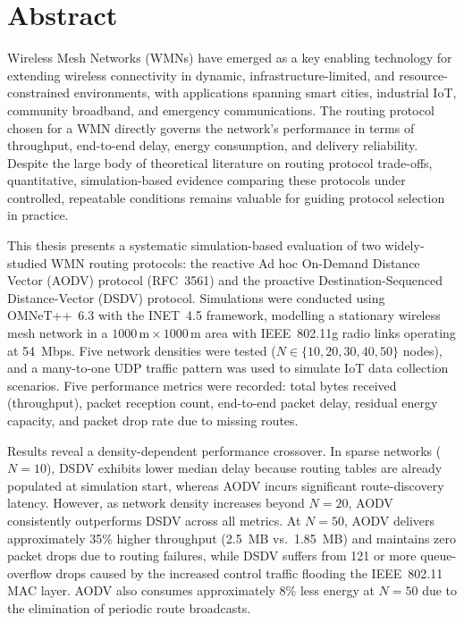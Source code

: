 \chapter*{Abstract}

Wireless Mesh Networks (WMNs) have emerged as a key enabling technology for extending
wireless connectivity in dynamic, infrastructure-limited, and resource-constrained
environments, with applications spanning smart cities, industrial IoT, community
broadband, and emergency communications. The routing protocol chosen for a WMN
directly governs the network's performance in terms of throughput, end-to-end delay,
energy consumption, and delivery reliability. Despite the large body of theoretical
literature on routing protocol trade-offs, quantitative, simulation-based evidence
comparing these protocols under controlled, repeatable conditions remains valuable for
guiding protocol selection in practice.

This thesis presents a systematic simulation-based evaluation of two widely-studied WMN
routing protocols: the reactive Ad hoc On-Demand Distance Vector (AODV) protocol
(RFC~3561) and the proactive Destination-Sequenced Distance-Vector (DSDV) protocol.
Simulations were conducted using OMNeT++~6.3 with the INET~4.5 framework, modelling
a stationary wireless mesh network in a $1000\,\text{m} \times 1000\,\text{m}$ area with
IEEE~802.11g radio links operating at 54~Mbps. Five network densities were tested
($N \in \{10, 20, 30, 40, 50\}$ nodes), and a many-to-one UDP traffic pattern was used
to simulate IoT data collection scenarios. Five performance metrics were recorded: total
bytes received (throughput), packet reception count, end-to-end packet delay, residual
energy capacity, and packet drop rate due to missing routes.

Results reveal a density-dependent performance crossover. In sparse networks ($N = 10$),
DSDV exhibits lower median delay because routing tables are already populated at
simulation start, whereas AODV incurs significant route-discovery latency. However, as
network density increases beyond $N = 20$, AODV consistently outperforms DSDV across
all metrics. At $N = 50$, AODV delivers approximately 35\% higher throughput
(2.5~MB vs.\ 1.85~MB) and maintains zero packet drops due to routing failures, while
DSDV suffers from 121 or more queue-overflow drops caused by the increased control
traffic flooding the IEEE~802.11 MAC layer. AODV also consumes approximately 8\%
less energy at $N = 50$ due to the elimination of periodic route broadcasts.

